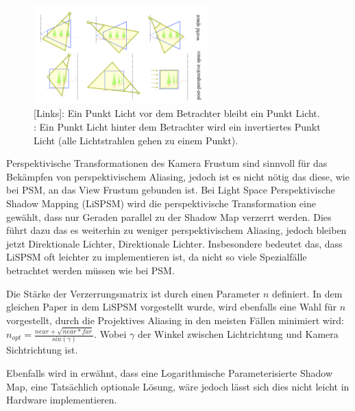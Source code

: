 \begin{figure}
	\begin{center}
    \includegraphics[width=0.6\textwidth]{res/img/psm_point_lights.png}
    \caption{[Links]: Ein Punkt Licht vor dem Betrachter bleibt ein Punkt Licht. \newline
      [Mitte]: Ein Punkt Licht hinter dem Betrachter wird ein
    invertiertes Punkt Licht (alle Lichtstrahlen gehen zu einem Punkt).}
	  \label{fig:psm-point-lights}
	\end{center}
\end{figure}
Perspektivische Transformationen des Kamera Frustum sind sinnvoll für das Bekämpfen von perspektivischem Aliasing,
jedoch ist es nicht nötig das diese, wie bei PSM, an das View Frustum gebunden ist.
Bei Light Space Perspektivische Shadow Mapping (LiSPSM) \cite{LiPSM2004} wird die perspektivische Transformation eine
gewählt, dass nur Geraden parallel zu der Shadow Map verzerrt werden. 
Dies führt dazu das es weiterhin zu weniger perspektivischem Aliasing, 
jedoch bleiben jetzt Direktionale Lichter, Direktionale Lichter.
Insbesondere bedeutet das, dass LiSPSM oft leichter zu implementieren ist, da nicht so viele Spezialfälle betrachtet werden müssen wie bei PSM.
\par
Die Stärke der Verzerrungsmatrix ist durch einen Parameter $n$ definiert.
In dem gleichen Paper in dem LiSPSM vorgestellt wurde, wird ebenfalls eine Wahl für $n$ vorgestellt,
durch die Projektives Aliasing in den meisten Fällen minimiert wird: $ n_{opt} = \frac{near + \sqrt{near * far}}{sin(\gamma)} $. Wobei $\gamma{}$ der Winkel zwischen Lichtrichtung und Kamera Sichtrichtung ist.
\par
Ebenfalls wird in \cite{LiPSM2004} erwähnt, dass eine Logarithmische Parameterisierte Shadow Map, eine Tatsächlich optionale Lösung, wäre
jedoch lässt sich dies nicht leicht in Hardware implementieren.
